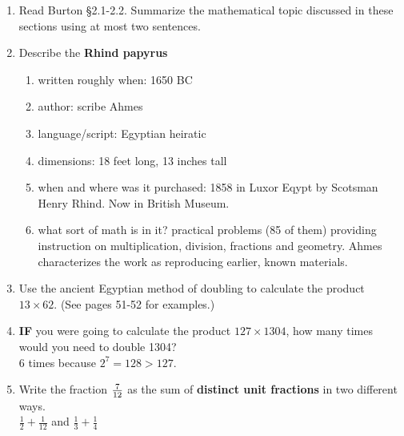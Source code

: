 \documentclass[12pt]{article}
\renewcommand{\emph}[1]{\textsf{\textbf{#1}}}
\begin{document}
\begin{enumerate}
\item Read Burton \S 2.1-2.2. Summarize the mathematical topic discussed in these sections using at most two sentences.
\vspace{1in}
\item Describe the \emph{Rhind papyrus}
	\begin{enumerate}
	\item written roughly when: 1650 BC
	\item author:
	 scribe Ahmes
	\item language/script: 
	 Egyptian heiratic
	\item dimensions: 
	18 feet long, 13 inches tall
	\item when and where was it purchased:
	1858 in Luxor Eqypt by Scotsman Henry Rhind. Now in British Museum.
	\item what sort of math is in it?
	 practical problems (85 of them) providing instruction on multiplication, division, fractions and geometry. Ahmes characterizes the work as reproducing earlier, known materials.
	\vfill
	\end{enumerate}
\item Use the ancient Egyptian method of doubling to calculate the product $13 \times 62.$ (See pages 51-52 for examples.)
\vspace{1.5in}
\item \textbf{IF} you were going to calculate the product $127 \times 1304$, how many times would you need to double 1304?\\

6 times because $2^7=128 > 127.$\\

\item Write the fraction $\large{\frac{7}{12}}$ as the sum of \emph{distinct unit fractions} in two different ways.\\

$\frac{1}{2}+\frac{1}{12}$ and $\frac{1}{3}+\frac{1}{4}$ 
\vfill
\end{enumerate}
\end{document}

